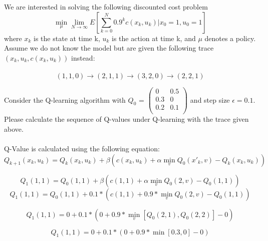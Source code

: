 \documentclass{article}
\begin{document}
We are interested in solving the following discounted cost problem \\ 
\begin{equation}
    \min_{\mu} \lim_{N \rightarrow{} \infty} E[\sum_{k=0}^{N}0.9^k c(x_k,u_k)|x_0=1, u_0=1]
\end{equation}
where $x_k$ is the state at time k, $u_k$ is the action at time k, and $\mu$ denotes a policy. \\
Assume we do not know the model but are given the following trace $(x_k, u_k, c(x_k, u_k))$ instead:\\\\
\begin{equation}
    (1,1,0) \rightarrow (2,1,1) \rightarrow (3,2,0) \rightarrow (2,2,1)
\end{equation}

Consider the Q-learning algorithm with $Q_0$ = $\begin{pmatrix}
    0 & 0.5 \\
    0.3 & 0 \\
    0.2 & 0.1 \\
\end{pmatrix}$ 
and step size $\epsilon=0.1$. Please calculate the sequence of Q-values under Q-learning with the trace given above.\\\\

Q-Value is calculated using the following equation:
\begin{equation}
    Q_{k+1}(x_k,u_k) = Q_k(x_k,u_k) + \beta (c(x_k,u_k) + \alpha \min_{v} Q_0(x'_k,v) - Q_{k}(x_k,u_k))
\end{equation}

\begin{equation}
    Q_{1}(1,1) = Q_0(1,1) + \beta (c(1,1) + \alpha \min_{v} Q_0(2,v) - Q_{0}(1,1))
\end{equation}
\begin{equation}
    Q_{1}(1,1) = Q_0(1,1) + 0.1 * (c(1,1) + 0.9 * \min_{v} Q_0(2,v) - Q_{0}(1,1))
\end{equation}


\begin{equation}
    Q_{1}(1,1) = 0 + 0.1 * (0 + 0.9 * \min_{v} [Q_0(2,1), Q_0(2,2)] - 0)
\end{equation}

\begin{equation}
    Q_{1}(1,1) = 0 + 0.1 * (0 + 0.9 * \min [0.3, 0] - 0)
\end{equation}
\end{document}
